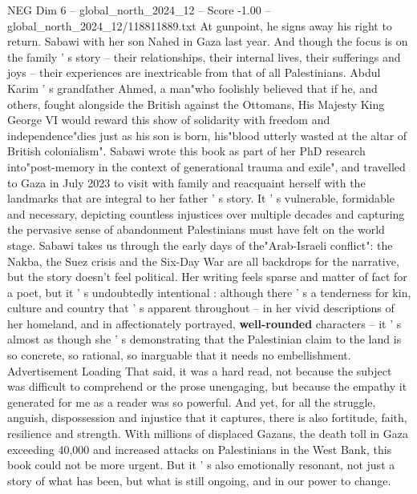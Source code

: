 \begin{textsample}{NEG Dim 6 – global\_north\_2024\_12 – Score -1.00 – global\_north\_2024\_12/118811889.txt}
At gunpoint, he signs away his right to return.
Sabawi with her son Nahed in Gaza last year.
And though the focus is on the family ' s story -- their relationships, their internal lives, their sufferings and joys -- their experiences are inextricable from that of all Palestinians.
Abdul Karim ' s grandfather Ahmed, a man"who foolishly believed that if he, and others, fought alongside the British against the Ottomans, His Majesty King George VI would reward this show of solidarity with freedom and independence"dies just as his son is born, his"blood utterly wasted at the altar of British colonialism".
Sabawi wrote this book as part of her PhD research into"post-memory in the context of generational trauma and exile", and travelled to Gaza in July 2023 to visit with family and reacquaint herself with the landmarks that are integral to her father ' s story.
It ' s vulnerable, formidable and necessary, depicting countless injustices over multiple decades and capturing the pervasive sense of abandonment Palestinians must have felt on the world stage.
Sabawi takes us through the early days of the"Arab-Israeli conflict": the Nakba, the Suez crisis and the Six-Day War are all backdrops for the narrative, but the story doesn't feel political.
Her writing feels sparse and matter of fact for a poet, but it ' s undoubtedly intentional : although there ' s a tenderness for kin, culture and country that ' s apparent throughout -- in her vivid descriptions of her homeland, and in affectionately portrayed, \textbf{well-rounded} characters -- it ' s almost as though she ' s demonstrating that the Palestinian claim to the land is so concrete, so rational, so inarguable that it needs no embellishment.
Advertisement Loading That said, it was a hard read, not because the subject was difficult to comprehend or the prose unengaging, but because the empathy it generated for me as a reader was so powerful.
And yet, for all the struggle, anguish, dispossession and injustice that it captures, there is also fortitude, faith, resilience and strength.
With millions of displaced Gazans, the death toll in Gaza exceeding 40,000 and increased attacks on Palestinians in the West Bank, this book could not be more urgent.
But it ' s also emotionally resonant, not just a story of what has been, but what is still ongoing, and in our power to change.

\end{textsample}
